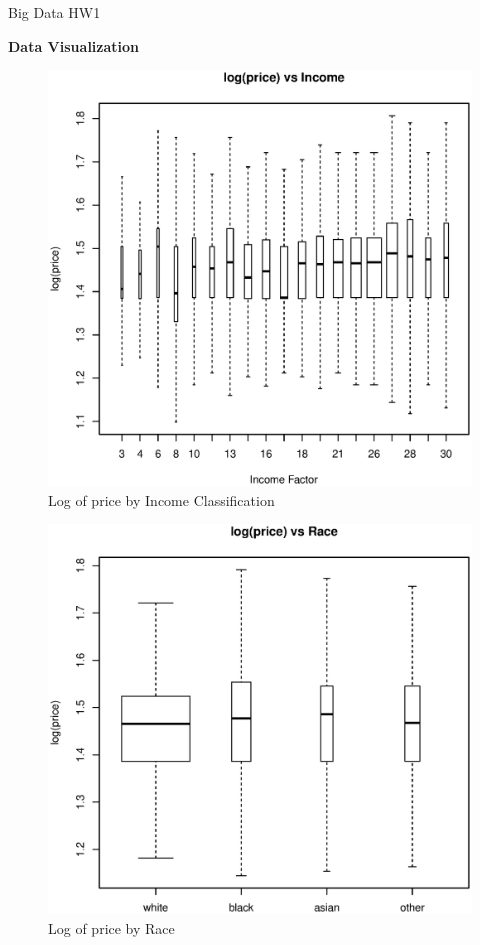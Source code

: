 \documentclass[11pt, fleqn]{article}
\begin{document}
Big Data HW1

\textbf{Data Visualization}

\begin{figure}[!htb]
  \centering
  \includegraphics[scale=.5]{income.eps}
  \caption{Log of price by Income Classification}
  \label{fig:income}
\end{figure}

\begin{figure}[!htb]
  \centering
  \includegraphics[scale=.5]{race.eps}
  \caption{Log of price by Race}
  \label{fig:race}
\end{figure}
\end{document}
